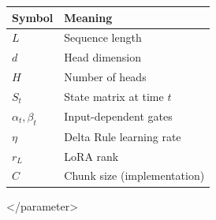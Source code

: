 \begin{table}[H]
\centering
\small
\begin{tabular}{ll}
\toprule
\textbf{Symbol} & \textbf{Meaning} \\
\midrule
$L$ & Sequence length \\
$d$ & Head dimension \\
$H$ & Number of heads \\
$S_t$ & State matrix at time $t$ \\
$\alpha_t, \beta_t$ & Input-dependent gates \\
$\eta$ & Delta Rule learning rate \\
$r_L$ & LoRA rank \\
$C$ & Chunk size (implementation) \\
\bottomrule
\end{tabular}
\end{table}
</parameter>

